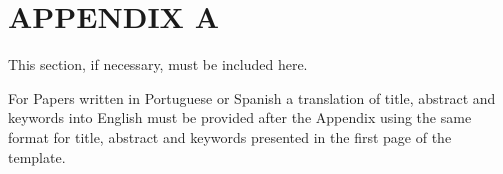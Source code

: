 \documentclass[12pt,fleqn]{article}
\begin{document}
\section*{APPENDIX A}
This section, if necessary, must be included here.

\vspace{0.5cm} %

For Papers written in Portuguese or Spanish a translation of title, abstract and keywords into English must be provided after the Appendix using the same format for title, abstract and keywords presented in the first page of the template.





\end{document}
